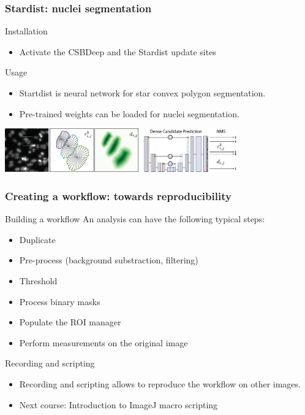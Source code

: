 \documentclass[ignorenonframetext,aspectratio=169,10pt,xcolor=table]{beamer}
\begin{document}


\begin{frame} \frametitle{Stardist: nuclei segmentation}

  \begin{block}{Installation}
    \begin{itemize}
    \item Activate the CSBDeep and the Stardist update sites
    \end{itemize}
  \end{block}
  \begin{block}{Usage}
    \begin{itemize}
    \item Startdist is neural network for star convex polygon segmentation.
    \item Pre-trained weights can be loaded for nuclei segmentation.
    \end{itemize}
    \begin{center}
      \includegraphics[width=0.75\textwidth]{stardist}
    \end{center}
  \end{block}

  \centering

\end{frame}

\begin{frame} \frametitle{Creating a workflow: towards reproducibility}

  \begin{block}{Building a workflow}
    An analysis can have the following typical steps:
    \begin{itemize}
      \item Duplicate
      \item Pre-process (background substraction, filtering)
      \item Threshold
      \item Process binary masks
      \item Populate the ROI manager
      \item Perform measurements on the original image
    \end{itemize}
  \end{block}

  \begin{block}{Recording and scripting}
    \begin{itemize}
    \item Recording and scripting allows to reproduce the workflow on other images.
    \item \alert{Next course:} Introduction to ImageJ macro scripting
  \end{itemize}
  \end{block}

\end{frame}
\end{document}
